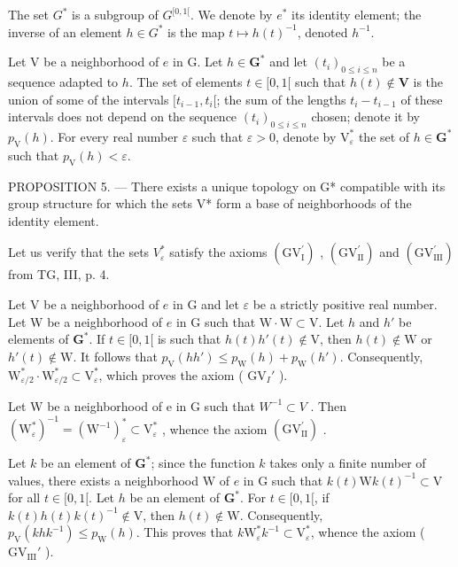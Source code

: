 The set \(G^{*}\) is a subgroup of \(G^{[0,1[}\). We denote by \(e^{*}\) its identity element; the inverse of an element \(h \in G^{*}\) is the map \(t \mapsto h(t)^{-1}\), denoted \(h^{-1}\).

Let V be a neighborhood of \(e\) in G. Let \(h \in \mathbf{G}^*\) and let \((t_i)_{0 \leqslant i \leqslant n}\) be a sequence adapted to \(h\). The set of elements \(t \in [0,1[\) such that \(h(t) \notin \mathbf{V}\) is the union of some of the intervals \([t_{i-1}, t_i[\); the sum of the lengths \(t_i - t_{i-1}\) of these intervals does not depend on the sequence \((t_i)_{0 \leqslant i \leqslant n}\) chosen; denote it by \(p_{\mathrm{V}}(h)\). For every real number \(\varepsilon\) such that \(\varepsilon > 0\), denote by \(\mathrm{V}_{\varepsilon}^*\) the set of \(h \in \mathbf{G}^*\) such that \(p_{\mathrm{V}}(h) < \varepsilon\).

PROPOSITION 5. --- There exists a unique topology on G* compatible with its group structure for which the sets V* form a base of neighborhoods of the identity element.

Let us verify that the sets \(V_{\varepsilon}^{*}\) satisfy the axioms \((\mathrm{GV}_{\mathrm{I}}^{\prime})\) , \((\mathrm{GV}_{\mathrm{II}}^{\prime})\) and \((\mathrm{GV}_{\mathrm{III}}^{\prime})\) from TG, III, p. 4.

Let V be a neighborhood of \(e\) in G and let \(\varepsilon\) be a strictly positive real number. Let W be a neighborhood of \(e\) in G such that \(\mathrm{W} \cdot \mathrm{W} \subset \mathrm{V}\). Let \(h\) and \(h'\) be elements of \(\mathbf{G}^*\). If \(t \in [0,1[\) is such that \(h(t)h'(t) \notin \mathrm{V}\), then \(h(t) \notin \mathrm{W}\) or \(h'(t) \notin \mathrm{W}\). It follows that \(p_{\mathrm{V}}(hh') \leqslant p_{\mathrm{W}}(h) + p_{\mathrm{W}}(h')\). Consequently, \(\mathrm{W}_{\varepsilon/2}^* \cdot \mathrm{W}_{\varepsilon/2}^* \subset \mathrm{V}_{\varepsilon}^*\), which proves the axiom ( \(\mathrm{GV}_I'\) ).

Let W be a neighborhood of e in G such that \(W^{-1} \subset V\) . Then \((\mathrm{W}_{\varepsilon}^{*})^{-1} = (\mathrm{W}^{-1})_{\varepsilon}^{*} \subset \mathrm{V}_{\varepsilon}^{*}\) , whence the axiom \((\mathrm{GV}_{\mathrm{II}}^{\prime})\) .

Let \(k\) be an element of \(\mathbf{G}^*\); since the function \(k\) takes only a finite number of values, there exists a neighborhood W of \(e\) in G such that \(k(t)\mathrm{W}k(t)^{-1}\subset \mathrm{V}\) for all \(t\in [0,1[\). Let \(h\) be an element of \(\mathbf{G}^*\). For \(t\in [0,1[\), if \(k(t)h(t)k(t)^{-1}\not\in\mathrm{V}\), then \(h(t)\not\in\mathrm{W}\). Consequently, \(p_{\mathrm{V}}(khk^{-1})\leqslant p_{\mathrm{W}}(h)\). This proves that \(k\mathrm{W}_{\varepsilon}^{*}k^{-1}\subset\mathrm{V}_{\varepsilon}^{*}\), whence the axiom ( \(\mathrm{GV}_{\mathrm{III}}'\) ).

